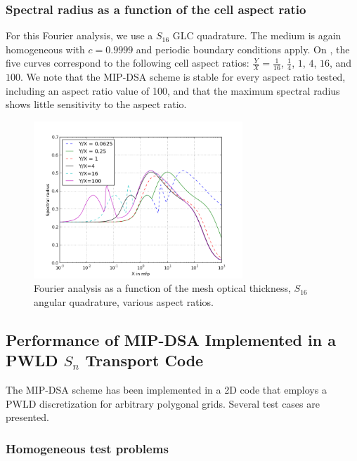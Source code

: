\subsubsection{Spectral radius as a function of the cell aspect ratio}
For this Fourier analysis, we use a $S_{16}$ GLC quadrature. The medium is
again homogeneous with $c=0.9999$ and periodic boundary conditions apply. 
On , the five curves correspond to the following cell aspect 
ratios: $\frac{Y}{X}=\frac{1}{16}$, $\frac{1}{4}$,
$1$, $4$, $16$, and $100$.
We note that the MIP-DSA scheme is stable for every aspect ratio tested, including an
aspect ratio value of 100, 
and that the maximum spectral radius shows little sensitivity to the aspect ratio.
\begin{figure}[!htbp]
  \centering
  \includegraphics[width=0.7\textwidth]{aspect_ratio_9999_2}
  \caption{Fourier analysis as a function of the mesh optical thickness,
  $S_{16}$ angular quadrature, various aspect ratios.}
  \label{fig_fa_ar}
\end{figure}

\subsection{Performance of MIP-DSA Implemented in a PWLD $S_n$ Transport Code}
The MIP-DSA scheme has been implemented in a 2D \sn code that employs a PWLD discretization
for arbitrary polygonal grids. Several test cases are presented.

\subsubsection{Homogeneous test problems}  \label{sec_homog}

